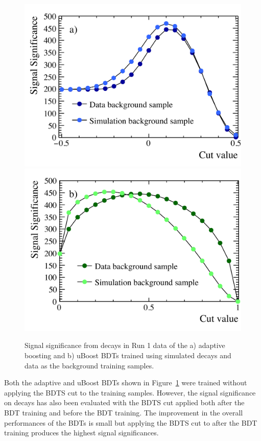 \begin{figure}[tbp]
    \centering
        \includegraphics[width=0.49 \textwidth]{./Figs/Selection/BDT_data_MC_comp.pdf}
       \includegraphics[width=0.49 \textwidth]{./Figs/Selection/uBoost_data_MC_comp.pdf}
    \caption{Signal significance from \bhh decays in Run 1 data of the a) adaptive boosting and b) uBoost BDTs trained using simulated decays and data as the background training samples.}
    \label{fig:SSelBDTs}
\end{figure}

Both the adaptive and uBoost BDTs shown in Figure~\ref{fig:SSelBDTs} were trained without applying the BDTS cut to the training samples. However, the signal significance on \bhh decays has also been evaluated with the BDTS cut applied both after the BDT training and before the BDT training. The improvement in the overall performances of the BDTs is small but applying the BDTS cut to \bhh after the BDT training produces the highest signal significances. 

